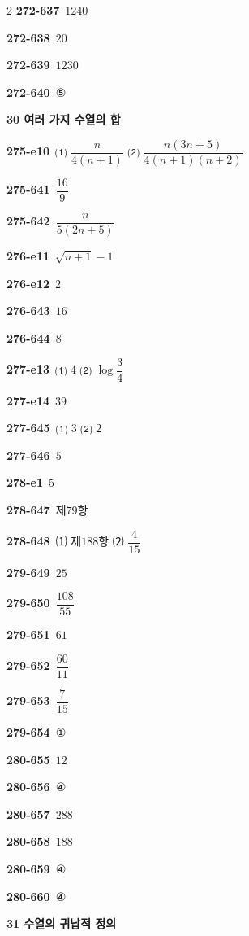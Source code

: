 \documentclass[10pt,a4paper]{article}
\begin{document}
\begin{multicols}{2}
\noindent\textbf{272-637}\ $1240$\par
\noindent\textbf{272-638}\ $20$\par
\noindent\textbf{272-639}\ $1230$\par
\noindent\textbf{272-640}\ ⑤\par
\noindent\textbf{30 여러 가지 수열의 합}\par\smallskip
\noindent\textbf{275-e10}\ ⑴ $\dfrac{n}{4(n+1)}$ ⑵ $\dfrac{n(3n+5)}{4(n+1)(n+2)}$\par
\noindent\textbf{275-641}\ $\dfrac{16}{9}$\par
\noindent\textbf{275-642}\ $\dfrac{n}{5(2n+5)}$\par
\noindent\textbf{276-e11}\ $\sqrt{n+1}-1$\par
\noindent\textbf{276-e12}\ $2$\par
\noindent\textbf{276-643}\ $16$\par
\noindent\textbf{276-644}\ $8$\par
\noindent\textbf{277-e13}\ ⑴ $4$ ⑵ $\log\dfrac{3}{4}$\par
\noindent\textbf{277-e14}\ $39$\par
\noindent\textbf{277-645}\ ⑴ $3$ ⑵ $2$\par
\noindent\textbf{277-646}\ $5$\par
\noindent\textbf{278-e1}\ $5$\par
\noindent\textbf{278-647}\ 제$79$항\par
\noindent\textbf{278-648}\ ⑴ 제$188$항 ⑵ $\dfrac{4}{15}$\par
\noindent\textbf{279-649}\ $25$\par
\noindent\textbf{279-650}\ $\dfrac{108}{55}$\par
\noindent\textbf{279-651}\ $61$\par
\noindent\textbf{279-652}\ $\dfrac{60}{11}$\par
\noindent\textbf{279-653}\ $\dfrac{7}{15}$\par
\noindent\textbf{279-654}\ ①\par
\noindent\textbf{280-655}\ $12$\par
\noindent\textbf{280-656}\ ④\par
\noindent\textbf{280-657}\ $288$\par
\noindent\textbf{280-658}\ $188$\par
\noindent\textbf{280-659}\ ④\par
\noindent\textbf{280-660}\ ④\par
\noindent\textbf{31 수열의 귀납적 정의}\par\smallskip

\end{multicols}
\end{document}
